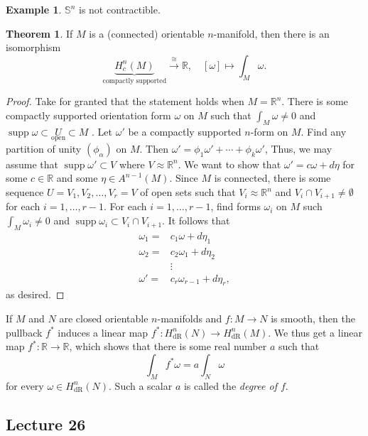 \documentclass[10pt,letterpaper,cm]{nupset}
\theoremstyle{definition}
\newtheorem{exmp}[definition]{Example}
\theoremstyle{theorem}
\newtheorem{theorem}[definition]{Theorem}
\theoremstyle{remark}
\newcommand{\R}{\mathbb R}
\renewcommand{\S}{\mathbb S}
\newcommand{\1}{\mathbf{1}}
\newcommand{\0}{\vec 0}
\DeclareMathOperator{\supp}{supp}
\DeclareMathOperator{\dr}{dR}
\begin{document}
\begin{exmp}
$\S^n$ is not contractible.
\end{exmp}

\begin{theorem}
If $M$ is a (connected) orientable $n$-manifold, then there is an isomorphism $$\underbrace{H_c^n(M)}_{\text{compactly supported}} \overset{\cong}{\longrightarrow} \R, \quad [\omega] \mapsto \int_M \omega.$$
\end{theorem}
\begin{proof}
Take for granted that the statement holds when $M = \R^n$. There is some compactly supported orientation form $\omega$ on $M$ such that $\int_M \omega \ne 0$ and $\supp \omega \subset \underset{\text{open}}{U}\subset M$ . Let $\omega'$ be a compactly supported $n$-form on $M$. Find any partition of unity $(\phi_{\alpha})$ on $M$. Then $\omega' =\phi_1\omega' +\cdots + \phi_k \omega'$, Thus, we may assume  that $\supp \omega' \subset V$ where $V \approx \R^n$. We want to show that $\omega' =c\omega + d\eta$ for some $c\in \R$ and some $\eta \in A^{n-1}(M)$. Since $M$ is connected, there is some sequence $U=V_1, V_2, \ldots, V_r=V$ of open sets such that $V_i\approx \R^n$ and $V_i\cap V_{i+1} \ne \emptyset$ for each $i=1, \ldots, r-1$. For each $i=1, \ldots, r-1$, find forms $\omega_i$ on $M$ such $\int_M \omega_i \ne 0$ and $\supp \omega_i \subset V_i \cap V_{i+1}$.  It follows that 
\begin{align*}
 \omega_1  =& c_1\omega + d\eta_1
\\ \omega_2  =& c_2\omega_1+ d\eta_2
\\ & \vdots
\\  \omega'  =&  c_r\omega_{r-1}+d\eta_r
, \end{align*} as desired.
\end{proof}

If $M$ and $N$ are closed orientable $n$-manifolds and $f: M \to N$ is smooth, then the pullback $f^{\ast}$ induces a linear map $f^{\ast}: H_{\dr}^n(N) \to H_{\dr}^n(M)$. We thus get a linear map $f^{\ast} : \R \to \R$, which shows that there is some  real number $a$ such that $$\int_{M} f^{\ast} \omega = a\int_N \omega$$ for every $\omega \in H_{\dr}^n(N) $. Such a scalar $a$ is called the \textit{degree of $f$}. 

\subsection{Lecture 26}
\end{document}
